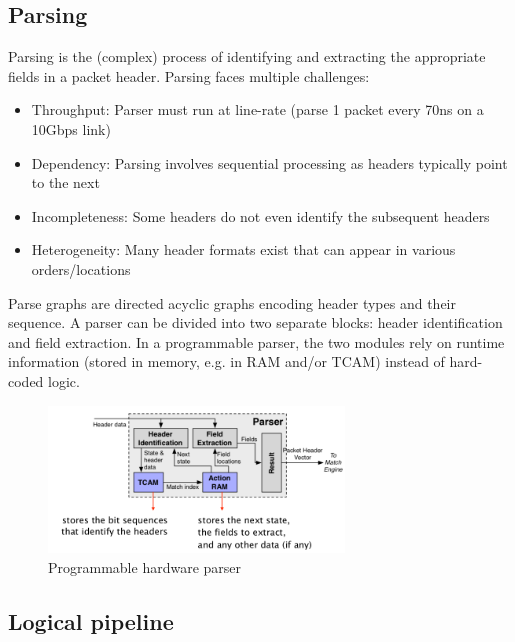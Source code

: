 \documentclass[11pt,oneside,a4paper]{article}
\begin{document}
\newpage

\subsection{Parsing}

Parsing is the (complex) process of identifying and extracting the appropriate fields in a packet header. Parsing faces multiple challenges:

\vspace{-\topsep}
\begin{itemize}
	\setlength{\itemsep}{0pt}
	\setlength{\parskip}{0pt}
	\item Throughput: Parser must run at line-rate (parse 1 packet every 70ns on a 10Gbps link)
	\item Dependency: Parsing involves sequential processing as headers typically point to the next
	\item Incompleteness: Some headers do not even identify the subsequent headers
	\item Heterogeneity: Many header formats exist that can appear in various orders/locations
\end{itemize}
\vspace{-\topsep}

\noindent Parse graphs are directed acyclic graphs encoding header types and their sequence. A parser can be divided into two separate blocks: header identification and field extraction. In a programmable parser, the two modules rely on runtime information (stored in memory, e.g. in RAM and/or TCAM) instead of hard-coded logic.

\begin{figure}[hb]
	\centering
	\includegraphics[width=0.7\textwidth,scale=1]{figures/hardware_parser}
	\caption{Programmable hardware parser}
	\label{fig:hardware_parser}
\end{figure}

\subsection{Logical pipeline}
\end{document}
